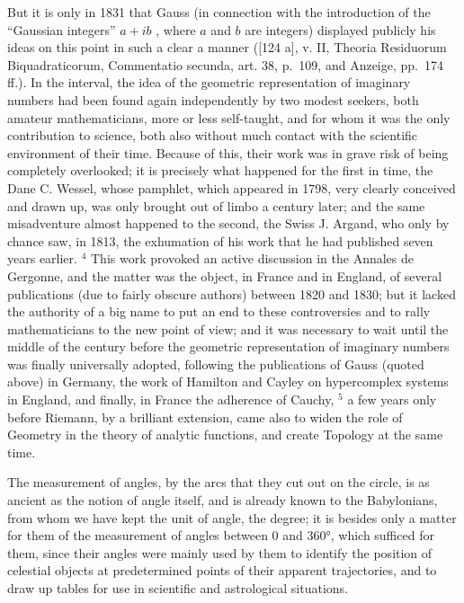 But it is only in 1831 that Gauss (in connection with the introduction of the ``Gaussian integers'' \(a + ib\) , where \(a\) and \(b\) are integers) displayed publicly his ideas on this point in such a clear a manner ({[}124 a{]}, v. II, Theoria Residuorum Biquadraticorum, Commentatio secunda, art. 38, p.~109, and Anzeige, pp.~174 ff.). In the interval, the idea of the geometric representation of imaginary numbers had been found again independently by two modest seekers, both amateur mathematicians, more or less self-taught, and for whom it was the only contribution to science, both also without much contact with the scientific environment of their time. Because of this, their work was in grave risk of being completely overlooked; it is precisely what happened for the first in time, the Dane C. Wessel, whose pamphlet, which appeared in 1798, very clearly conceived and drawn up, was only brought out of limbo a century later; and the same misadventure almost happened to the second, the Swiss J. Argand, who only by chance saw, in 1813, the exhumation of his work that he had published seven years earlier. \(^{4}\) This work provoked an active discussion in the Annales de Gergonne, and the matter was the object, in France and in England, of several publications (due to fairly obscure authors) between 1820 and 1830; but it lacked the authority of a big name to put an end to these controversies and to rally mathematicians to the new point of view; and it was necessary to wait until the middle of the century before the geometric representation of imaginary numbers was finally universally adopted, following the publications of Gauss (quoted above) in Germany, the work of Hamilton and Cayley on hypercomplex systems in England, and finally, in France the adherence of Cauchy, \(^{5}\) a few years only before Riemann, by a brilliant extension, came also to widen the role of Geometry in the theory of analytic functions, and create Topology at the same time.

The measurement of angles, by the arcs that they cut out on the circle, is as ancient as the notion of angle itself, and is already known to the Babylonians, from whom we have kept the unit of angle, the degree; it is besides only a matter for them of the measurement of angles between 0 and 360°, which sufficed for them, since their angles were mainly used by them to identify the position of celestial objects at predetermined points of their apparent trajectories, and to draw up tables for use in scientific and astrological situations.

